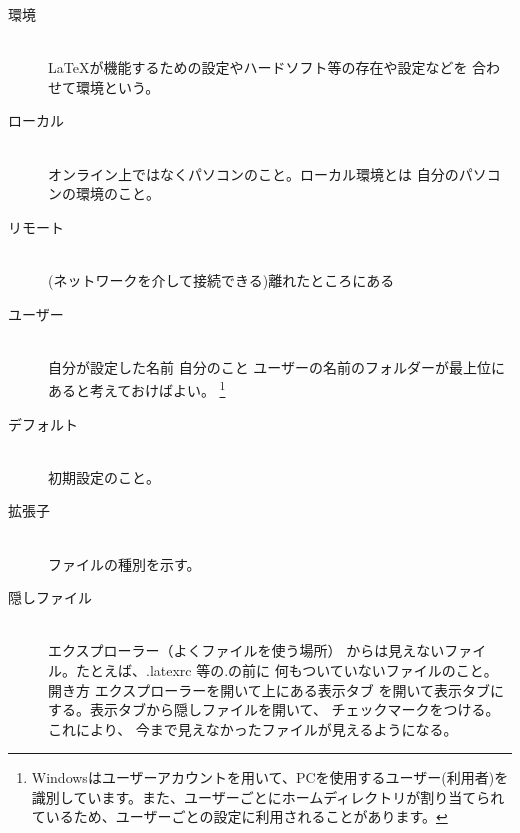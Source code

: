 \documentclass[titlepage]{ltjsarticle}
\begin{document}
\begin{description}
  \item [環境] ~\\
        \LaTeX が機能するための設定やハードソフト等の存在や設定などを
        合わせて環境という。
  \item [ローカル] ~\\
        オンライン上ではなくパソコンのこと。ローカル環境とは
        自分のパソコンの環境のこと。


  \item[リモート] ~\\
    (ネットワークを介して接続できる)離れたところにある
  \item [ユーザー] ~\\
        自分が設定した名前 自分のこと
        ユーザーの名前のフォルダーが最上位にあると考えておけばよい。
        \footnote{Windowsはユーザーアカウントを用いて、PCを使用するユーザー(利用者)を識別しています。また、ユーザーごとにホームディレクトリが割り当てられているため、ユーザーごとの設定に利用されることがあります。}


  \item [デフォルト] ~\\
        初期設定のこと。
  \item[拡張子] ~\\
    ファイルの種別を示す。
  \item [隠しファイル] ~\\
        エクスプローラー（よくファイルを使う場所）
        からは見えないファイル。たとえば、.latexrc 等の.の前に
        何もついていないファイルのこと。
        開き方 エクスプローラーを開いて上にある表示タブ
        を開いて表示タブにする。表示タブから隠しファイルを開いて、
        チェックマークをつける。これにより、
        今まで見えなかったファイルが見えるようになる。


\end{description}
\end{document}
